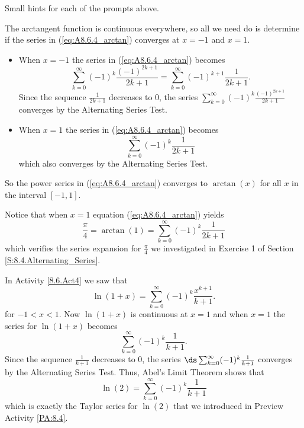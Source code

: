 \begin{smallhint}
\ba
	\item Small hints for each of the prompts above.
\ea
\end{smallhint}
\begin{bighint}

\end{bighint}
\begin{activitySolution}
\ba
	\item The arctangent function is continuous everywhere, so all we need do is determine if the series in (\ref{eq:A8.6.4_arctan}) converges at $x=-1$ and $x=1$.
\begin{itemize}
\item When $x=-1$ the series in (\ref{eq:A8.6.4_arctan}) becomes
\[\sum_{k=0}^{\infty} (-1)^k\frac{(-1)^{2k+1}}{2k+1} = \sum_{k=0}^{\infty} (-1)^{k+1}\frac{1}{2k+1}.\]
Since the sequence $\frac{1}{2k+1}$ decreases to $0$, the series $\sum_{k=0}^{\infty} (-1)^k\frac{(-1)^{2k+1}}{2k+1}$ converges by the Alternating Series Test.
\item When $x=1$ the series in (\ref{eq:A8.6.4_arctan}) becomes
\[\sum_{k=0}^{\infty} (-1)^k\frac{1}{2k+1}\]
which also converges by the Alternating Series Test.
\end{itemize}
So the power series in (\ref{eq:A8.6.4_arctan}) converges to $\arctan(x)$ for all $x$ in the interval $[-1,1]$.

    \item Notice that when $x=1$ equation (\ref{eq:A8.6.4_arctan}) yields
    \[\frac{\pi}{4} = \arctan(1) = \sum_{k=0}^{\infty} (-1)^k\frac{1}{2k+1}\]
    which verifies the series expansion for $\frac{\pi}{4}$ we investigated in Exercise 1 of Section \ref{S:8.4.Alternating_Series}.

    \item In Activity \ref{8.6.Act4} we saw that
       \[\ln(1+x) = \sum_{k=0}^{\infty} (-1)^k \frac{x^{k+1}}{k+1}.\]
    for $-1 < x < 1$. Now $\ln(1+x)$ is continuous at $x=1$ and when $x=1$ the series for $\ln(1+x)$ becomes
    \[\sum_{k=0}^{\infty} (-1)^k \frac{1}{k+1}.\]
    Since the sequence $\frac{1}{k+1}$ decreases to 0, the series $\ds \sum_{k=0}^{\infty} (-1)^k \frac{1}{k+1}$ converges by the Alternating Series Test. Thus, Abel's Limit Theorem shows that
    \[\ln(2) = \sum_{k=0}^{\infty} (-1)^k \frac{1}{k+1}\]
    which is exactly the Taylor series for $\ln(2)$ that we introduced in Preview Activity \ref{PA:8.4}. 
\ea

\end{activitySolution}
\aftera 